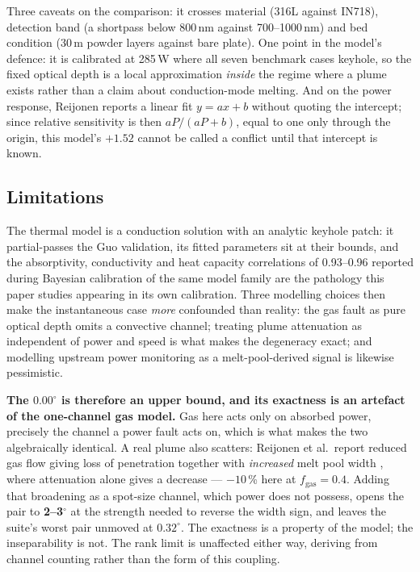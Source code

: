 \documentclass[final,5p,times,twocolumn]{elsarticle}
\begin{document}
Three caveats on the comparison: it crosses material (316L against IN718),
detection band (a shortpass below 800\,nm against 700--1000\,nm) and bed
condition (30\,\textmu m powder layers against bare plate). One point in the
model's defence: it is calibrated at 285\,W where all seven benchmark cases
keyhole, so the fixed optical depth is a local approximation \emph{inside} the
regime where a plume exists rather than a claim about conduction-mode melting.
And on the power response, Reijonen reports a linear fit $y=ax+b$ without
quoting the intercept; since relative sensitivity is then $aP/(aP+b)$, equal to
one only through the origin, this model's $+1.52$ cannot be called a conflict
until that intercept is known.

\subsection{Limitations}
\label{sec:limits}

The thermal model is a conduction solution with an analytic keyhole patch: it
partial-passes the Guo validation, its fitted parameters sit at their bounds, and
the absorptivity, conductivity and heat capacity correlations of 0.93--0.96
reported during Bayesian calibration of the same model family \cite{Hon2021} are
the pathology this paper studies appearing in its own calibration. Three
modelling choices then make the instantaneous case \emph{more} confounded than
reality: the gas fault as pure optical depth omits a convective channel; treating
plume attenuation as independent of power and speed is what makes the degeneracy
exact; and modelling upstream power monitoring as a melt-pool-derived signal is
likewise pessimistic.

\textbf{The $0.00^\circ$ is therefore an upper bound, and its exactness is an
artefact of the one-channel gas model.} Gas here acts only on absorbed power,
precisely the channel a power fault acts on, which is what makes the two
algebraically identical. A real plume also scatters: Reijonen et al.\ report
reduced gas flow giving loss of penetration together with \emph{increased} melt
pool width \cite{Reijonen2020}, where attenuation alone gives a decrease ---
$-10$\,\% here at $f_{\mathrm{gas}}=0.4$. Adding that broadening as a spot-size
channel, which power does not possess, opens the pair to \textbf{2--3$^\circ$}
at the strength needed to reverse the width sign, and leaves the suite's worst
pair unmoved at $0.32^\circ$. The exactness is a property of the model; the
inseparability is not. The rank limit is unaffected either way, deriving from
channel counting rather than the form of this coupling.
\end{document}
